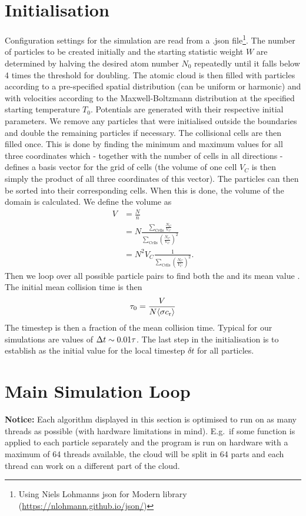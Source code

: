 \section{Initialisation}
Configuration settings for the simulation are read from a .json file\footnote{Using Niels Lohmanns json for Modern \Cpp library (\url{https://nlohmann.github.io/json/})}. 
The number of particles to be created initially and the starting statistic weight $W$ are determined by halving the desired atom number $N_0$ repeatedly until it falls below 4 times the threshold for doubling.
The atomic cloud is then filled with particles according to a pre-specified spatial distribution (can be uniform or harmonic) and with velocities according to the Maxwell-Boltzmann distribution at the specified starting temperature $T_0$.
Potentials are generated with their respective initial parameters.
We remove any particles that were initialised outside the boundaries and double the remaining particles if necessary.
The collisional cells are then filled once. This is done by finding the minimum and maximum values for all three coordinates which - together with the number of cells in all directions - defines a basis vector for the grid of cells (the volume of one cell $V_C$ is then simply the product of all three coordinates of this vector). The particles can then be sorted into their corresponding cells. When this is done, the volume of the domain is calculated. We define the volume as
\begin{align*}
    V &= \frac{N}{\overline{n}} \\
    &= N \frac{\sum_\text{Cells} \frac{N_C}{V_C}}{\sum_\text{Cells} \left(\frac{N_C}{V_C}\right)^2} \\
    & = N^2V_C \frac{1}{\sum_\text{Cells} \left(\frac{N_C}{V_C}\right)^2}.
\end{align*}
Then we loop over all possible particle pairs to find both the \maxProb and its mean value \meanProb. The initial mean collision time is then
\begin{equation*}
    \tau_0 = \frac{V}{N\langle\sigma c_\text{r}\rangle}
\end{equation*}
The timestep \Dt is then a fraction of the mean collision time. Typical for our simulations are values of $\Delta t \sim \num{0.01}\tau$. The last step in the initialisation is to establish \Dt as the initial value for the local timestep $\delta t$ for all particles.
%
\section{Main Simulation Loop}
\textbf{Notice:} Each algorithm displayed in this section is optimised to run on as many threads as possible (with hardware limitations in mind). E.g.\ if some function is applied to each particle separately and the program is run on hardware with a maximum of 64 threads available, the cloud will be split in 64 parts and each thread can work on a different part of the cloud.

